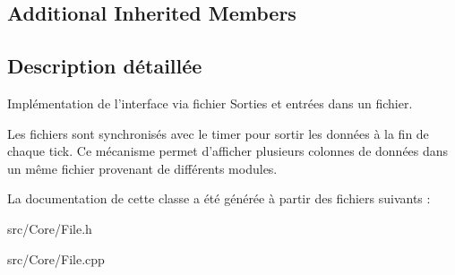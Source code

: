 \subsection*{Additional Inherited Members}


\subsection{Description détaillée}
Implémentation de l'interface via fichier Sorties et entrées dans un fichier. 

Les fichiers sont synchronisés avec le timer pour sortir les données à la fin de chaque tick. Ce mécanisme permet d'afficher plusieurs colonnes de données dans un même fichier provenant de différents modules. 

La documentation de cette classe a été générée à partir des fichiers suivants \-:\begin{DoxyCompactItemize}
\item 
src/\-Core/File.\-h\item 
src/\-Core/File.\-cpp\end{DoxyCompactItemize}
